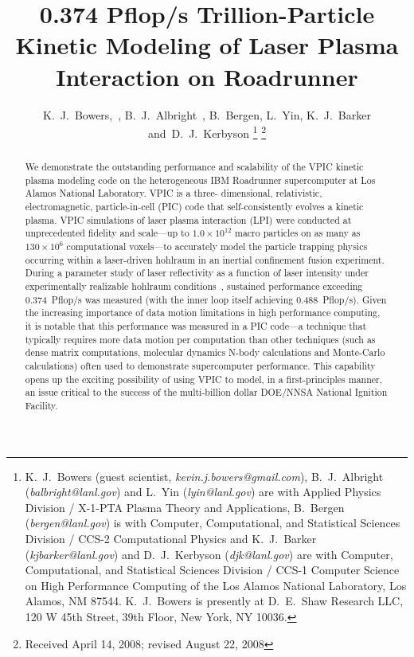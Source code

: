 \documentclass[journal,twoside]{IEEEtran}
\begin{document}
\title{0.374 Pflop/s Trillion-Particle Kinetic Modeling of Laser Plasma
Interaction on Roadrunner}

\author{K.~J.~Bowers,~,
        B.~J.~Albright~,
        B.~Bergen,
        L.~Yin,
        K.~J.~Barker
        and~D.~J.~Kerbyson%
\thanks{
K.~J.~Bowers (guest scientist, \emph{kevin.j.bowers@gmail.com}),
B.~J.~Albright (\emph{balbright@lanl.gov}) and L.~Yin
(\emph{lyin@lanl.gov}) are with Applied Physics Division / X-1-PTA
Plasma Theory and Applications, B.~Bergen (\emph{bergen@lanl.gov}) is
with Computer, Computational, and Statistical Sciences Division /
CCS-2 Computational Physics and K.~J.~Barker
(\emph{kjbarker@lanl.gov}) and D.~J.~Kerbyson (\emph{djk@lanl.gov})
are with Computer, Computational, and Statistical Sciences Division /
CCS-1 Computer Science on High Performance Computing of the Los Alamos
National Laboratory, Los Alamos, NM 87544.  K.~J.~Bowers is presently
at D.~E.~Shaw Research LLC, 120 W 45th Street, 39th Floor, New York,
NY 10036.}%
\thanks{Received April 14, 2008; revised August 22, 2008}
}


\maketitle

\begin{abstract}
We demonstrate the outstanding performance and scalability of the VPIC
kinetic plasma modeling code on the heterogeneous IBM Roadrunner
supercomputer at Los Alamos National Laboratory.  VPIC is a three-
dimensional, relativistic, electromagnetic, particle-in-cell (PIC)
code that self-consistently evolves a kinetic plasma.  VPIC
simulations of laser plasma interaction (LPI) were conducted at
unprecedented fidelity and scale---up to $1.0 \times 10^{12}$ macro
particles on as many as $130
\times 10^6$ computational voxels---to accurately model the particle
trapping physics occurring within a laser-driven hohlraum in an
inertial confinement fusion experiment.  During a parameter study of
laser reflectivity as a function of laser intensity under
experimentally realizable hohlraum
conditions~\cite{AAC_Conference_Paper}, sustained performance
exceeding 0.374~Pflop/s was measured (with the inner loop itself
achieving 0.488~Pflop/s).  Given the increasing importance of
data motion limitations in high performance computing, it is notable
that this performance was measured in a PIC code---a technique that
typically requires more data motion per computation than other
techniques (such as dense matrix computations, molecular dynamics
N-body calculations and Monte-Carlo calculations) often used to
demonstrate supercomputer performance.  This capability opens up the
exciting possibility of using VPIC to model, in a first-principles
manner, an issue critical to the success of the multi-billion dollar
DOE/NNSA National Ignition Facility.
\end{abstract}
\end{document}
